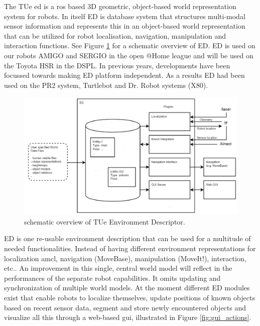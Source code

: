 The TUe \acrfull{ed} is a \acrfull{ros} based 3D geometric, object-based world representation system for robots. In itself ED is database system that structures multi-modal sensor information and represents this in an object-based world representation that can be utilized for robot localisation, navigation, manipulation and interaction functions. See Figure \ref{fig:ed} for a schematic overview of ED. %
ED is used on our robots AMIGO and SERGIO in the open @Home league and will be used on the Toyota HSR in the DSPL. In previous years, developments have been focussed towards making ED platform independent. As a results ED had been used on the PR2 system, Turtlebot and Dr. Robot systems (X80).
\begin{figure}[h]
	\includegraphics[width = 0.9\linewidth]{Figures/ed_overview}
	\caption{schematic overview of TUe Environment Descriptor.}
	\label{fig:ed}
\end{figure}
ED is one re-usable environment description that can be used for a multitude of needed functionalities. Instead of having different environment representations for localization \acrfull{amcl}, navigation (MoveBase), manipulation (MoveIt!), interaction, etc.. An improvement in this single, central world model will reflect in the performances of the separate robot capabilities. It omits updating and synchronization of multiple world models. At the moment different ED modules exist that enable robots to localize themselves, update positions of known objects based on recent sensor data, segment and store newly encountered objects and visualize all this through a web-based \acrshort{gui}, illustrated in Figure \ref{fig:gui_actions}.
